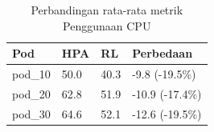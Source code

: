 \begin{table}[ht]
  \centering
  \caption{Perbandingan rata-rata metrik Penggunaan CPU}\label{tab:deskriptif-cpu}
  \begin{tabular}{llll}
    \toprule
    Pod & HPA & RL & Perbedaan \\
    \midrule
    pod\_10 & 50.0 & 40.3 & -9.8 (-19.5\%) \\
    pod\_20 & 62.8 & 51.9 & -10.9 (-17.4\%) \\
    pod\_30 & 64.6 & 52.1 & -12.6 (-19.5\%) \\
    \bottomrule
  \end{tabular}
\end{table}